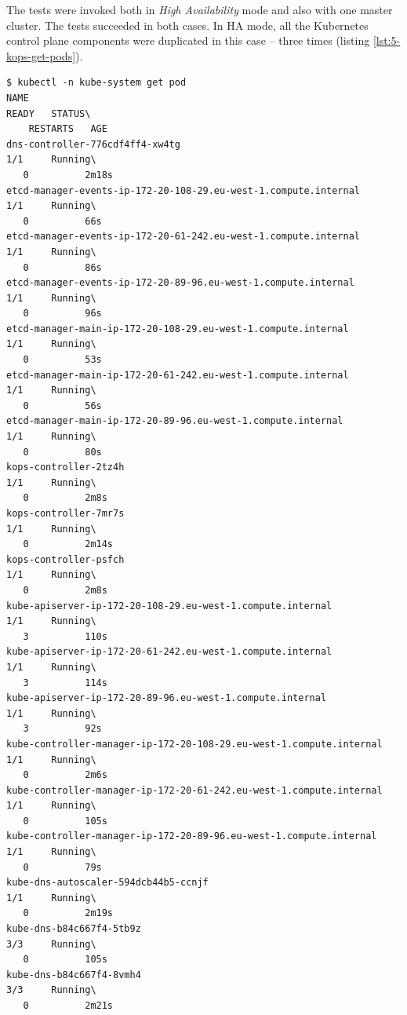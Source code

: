 The tests were invoked both in \textit{High Availability} mode and also with one master cluster. The tests succeeded in both cases. In HA mode, all the Kubernetes control plane components were duplicated in this case -- three times (listing \ref{lst:5-kops-get-pods}).
\begin{lstlisting}[basicstyle=\scriptsize,xleftmargin=0cm,label=lst:5-kops-get-pods,caption={Kubernetes control plane components, \textit{High Availability}}]
$ kubectl -n kube-system get pod
NAME                                                                  READY   STATUS\
    RESTARTS   AGE
dns-controller-776cdf4ff4-xw4tg                                       1/1     Running\
   0          2m18s
etcd-manager-events-ip-172-20-108-29.eu-west-1.compute.internal       1/1     Running\
   0          66s
etcd-manager-events-ip-172-20-61-242.eu-west-1.compute.internal       1/1     Running\
   0          86s
etcd-manager-events-ip-172-20-89-96.eu-west-1.compute.internal        1/1     Running\
   0          96s
etcd-manager-main-ip-172-20-108-29.eu-west-1.compute.internal         1/1     Running\
   0          53s
etcd-manager-main-ip-172-20-61-242.eu-west-1.compute.internal         1/1     Running\
   0          56s
etcd-manager-main-ip-172-20-89-96.eu-west-1.compute.internal          1/1     Running\
   0          80s
kops-controller-2tz4h                                                 1/1     Running\
   0          2m8s
kops-controller-7mr7s                                                 1/1     Running\
   0          2m14s
kops-controller-psfch                                                 1/1     Running\
   0          2m8s
kube-apiserver-ip-172-20-108-29.eu-west-1.compute.internal            1/1     Running\
   3          110s
kube-apiserver-ip-172-20-61-242.eu-west-1.compute.internal            1/1     Running\
   3          114s
kube-apiserver-ip-172-20-89-96.eu-west-1.compute.internal             1/1     Running\
   3          92s
kube-controller-manager-ip-172-20-108-29.eu-west-1.compute.internal   1/1     Running\
   0          2m6s
kube-controller-manager-ip-172-20-61-242.eu-west-1.compute.internal   1/1     Running\
   0          105s
kube-controller-manager-ip-172-20-89-96.eu-west-1.compute.internal    1/1     Running\
   0          79s
kube-dns-autoscaler-594dcb44b5-ccnjf                                  1/1     Running\
   0          2m19s
kube-dns-b84c667f4-5tb9z                                              3/3     Running\
   0          105s
kube-dns-b84c667f4-8vmh4                                              3/3     Running\
   0          2m21s

\end{lstlisting}
